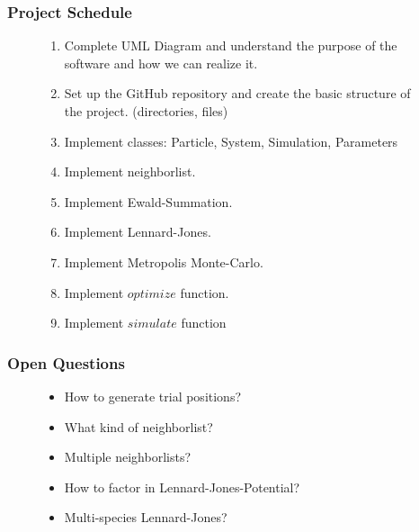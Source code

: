 \documentclass[10pt, compress]{beamer}
\begin{document}
\begin{frame}[fragile]
	\frametitle{Project Schedule}
	\begin{figure}
    	\begin{enumerate}
    		\item Complete UML Diagram and understand the purpose of the software and how we can realize it.
            \item Set up the GitHub repository and create the basic structure of the project. (directories, files)
            \item Implement classes: Particle, System, Simulation, Parameters
            \item Implement neighborlist.
            \item Implement Ewald-Summation.
            \item Implement Lennard-Jones.
            \item Implement Metropolis Monte-Carlo.
            \item Implement $optimize$ function.
            \item Implement $simulate$ function
    	\end{enumerate}
	\end{figure}
\end{frame}

\begin{frame}[fragile]
	\frametitle{Open Questions}
	\begin{figure}
    	\begin{itemize}
    		\item How to generate trial positions?
            \item What kind of neighborlist?
            \item Multiple neighborlists?
            \item How to factor in Lennard-Jones-Potential?
            \item Multi-species Lennard-Jones?
    	\end{itemize}
	\end{figure}
\end{frame}

\end{document}
